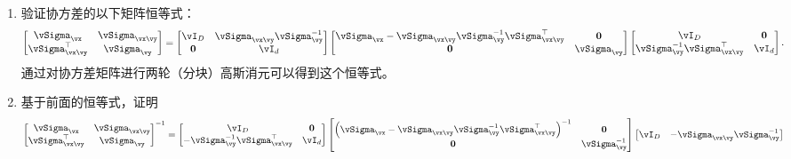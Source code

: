 \documentclass[../../book-main_zh.tex]{subfiles}
\begin{document}
\begin{exercise}
  \begin{enumerate}
    \item 验证协方差的以下矩阵恒等式：
      \begin{equation}\label{eq:gaussian-conditional-covariance-block}
        \begin{bmatrix}
          \vSigma_{\vx} & \vSigma_{\vx\vy} \\
          \vSigma_{\vx\vy}^\top & \vSigma_{\vy}
        \end{bmatrix}
        =
        \begin{bmatrix}
          \vI_D & \vSigma_{\vx\vy}\vSigma_{\vy}^{-1} \\
          \Zero & \vI_d
        \end{bmatrix}
        \begin{bmatrix}
          \vSigma_{\vx} - \vSigma_{\vx\vy} \vSigma_{\vy}^{-1}
          \vSigma_{\vx\vy}^{\top} & \Zero \\
          \Zero & \vSigma_{\vy}
        \end{bmatrix}
        \begin{bmatrix}
          \vI_D & \Zero\\
          \vSigma_{\vy}^{-1}\vSigma_{\vx\vy}^\top & \vI_d
        \end{bmatrix}.
      \end{equation}
      通过对协方差矩阵进行两轮（分块）高斯消元可以得到这个恒等式。
    \item 基于前面的恒等式，证明
      \begin{equation}\label{eq:gaussian-conditional-covariance-inverse-block}
        \begin{bmatrix}
          \vSigma_{\vx} & \vSigma_{\vx\vy} \\
          \vSigma_{\vx\vy}^\top & \vSigma_{\vy}
        \end{bmatrix}^{-1}
        =
        \begin{bmatrix}
          \vI_D & \Zero\\
          -\vSigma_{\vy}^{-1}\vSigma_{\vx\vy}^\top & \vI_d
        \end{bmatrix}
        \begin{bmatrix}
          \left(\vSigma_{\vx} - \vSigma_{\vx\vy} \vSigma_{\vy}^{-1}
          \vSigma_{\vx\vy}^{\top}\right)^{-1} & \Zero \\
          \Zero & \vSigma_{\vy}^{-1}
        \end{bmatrix}
        \begin{bmatrix}
          \vI_D & -\vSigma_{\vx\vy}\vSigma_{\vy}^{-1} \\

\end{bmatrix}
\end{equation}
\end{enumerate}
\end{exercise}
\end{document}
